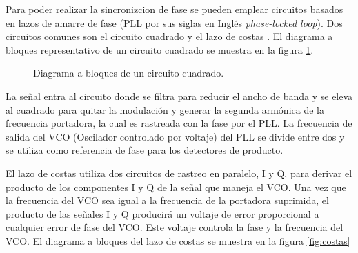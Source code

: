 Para poder realizar la sincronizcion de fase se pueden emplear circuitos basados en lazos de amarre de fase (PLL por sus siglas
en Ingl\'es \emph{phase-locked loop}). Dos circuitos comunes son el circuito cuadrado y el lazo de costas \cite{perez}. El
diagrama a bloques representativo de un circuito cuadrado se muestra en la figura \ref{fig:ccuad}.

\begin{figure}[htp]
\centering
    \vspace{0.3in}
    \caption{Diagrama a bloques de un circuito cuadrado. \protect\cite{perez}}
    \label{fig:ccuad}
\end{figure}

La se\~nal entra al circuito donde se filtra para reducir el ancho de banda y se eleva al cuadrado para quitar la modulaci\'on y
generar la segunda arm\'onica de la frecuencia portadora, la cual es rastreada con la fase por el PLL. La frecuencia de salida del
VCO (Oscilador controlado por voltaje) del PLL se divide entre dos y se utiliza como referencia de fase para los detectores de
producto.

El lazo de costas utiliza dos circuitos de rastreo en paralelo, I y Q, para derivar el producto de los componentes I y Q de la
se\~nal que maneja el VCO. Una vez que la frecuencia del VCO sea igual a la frecuencia de la portadora suprimida, el producto de
las se\~nales I y Q producir\'a un voltaje de error proporcional a cualquier error de fase del VCO. Este voltaje controla la fase
y la frecuencia del VCO. El diagrama a bloques del lazo de costas se muestra en la figura \ref{fig:costas}

